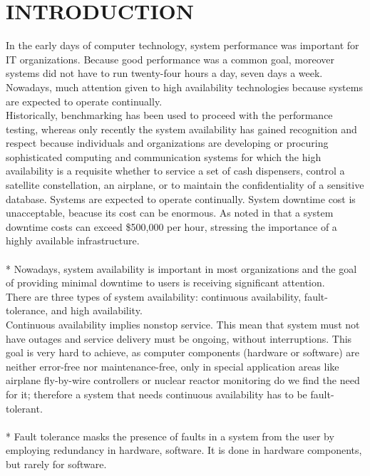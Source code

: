 \documentclass[english]{tktltiki2}
\theoremstyle{definition}
\theoremstyle{remark}
\begin{document}
\section{INTRODUCTION} \label{intro}
In the early days of computer technology, system performance was important for IT organizations. Because good performance was a common goal, moreover systems did not have to run twenty-four hours a day, seven days a week. Nowadays, much attention given to high availability technologies  because systems are expected to operate continually.\\
Historically, benchmarking \cite{survey} has been used to proceed with the performance
testing, whereas only recently the system availability has gained recognition and respect  because  individuals and organizations are developing or procuring sophisticated computing and communication systems for which the high availability is a requisite whether to service a set of cash dispensers, control a satellite constellation, an airplane, or to maintain the confidentiality of a sensitive database. Systems are  expected to operate continually. System downtime cost is unacceptable, beacuse its cost can be enormous. As noted in \cite{AvalDisgest} that a system downtime costs can exceed \$500,000 per hour, stressing the importance of a highly available infrastructure.\\ \\*
Nowadays, system availability is important in most organizations and the goal of providing minimal downtime to users is receiving significant attention.\\ 
There are three types of system availability: continuous availability, fault-tolerance, and high availability.\\ 
Continuous availability implies nonstop service. This mean that system must not have outages and service delivery must be ongoing, without interruptions. This goal is very hard to achieve, as computer components (hardware or software)  are neither error-free nor maintenance-free, only in special application areas like airplane fly-by-wire controllers or nuclear reactor monitoring do we find the need for it;  therefore a system that needs continuous availability has to be fault-tolerant.\\ \\*
Fault tolerance \cite{1672217, Jalote:1994:FTD:179250} masks the presence of faults in a system from the user by employing redundancy in hardware, software. It is done in hardware components, but rarely for software.\\
\end{document}

